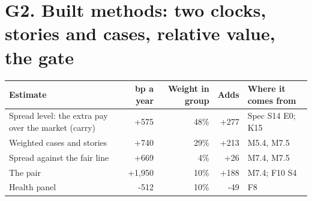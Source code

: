 \documentclass[11pt,a4paper]{article}
\begin{document}
\section*{G2. Built methods: two clocks, stories and cases, relative value, the gate}
\par\noindent{}
\begin{center}\footnotesize\setlength{\tabcolsep}{3.5pt}\begin{tabular}{@{}p{6.2cm}rrrp{4.2cm}@{}}\toprule
Estimate & bp a year & Weight in group & Adds & Where it comes from \\\midrule
Spread level: the extra pay over the market (carry) & +575 & 48\% & +277 & Spec S14 E0; K15 \\
Weighted cases and stories & +740 & 29\% & +213 & M5.4, M7.5 \\
Spread against the fair line & +669 & 4\% & +26 & M7.4, M7.5 \\
The pair & +1,950 & 10\% & +188 & M7.4; F10 S4 \\
Health panel & -512 & 10\% & -49 & F8 \\
\bottomrule\end{tabular}\end{center}
\end{document}
